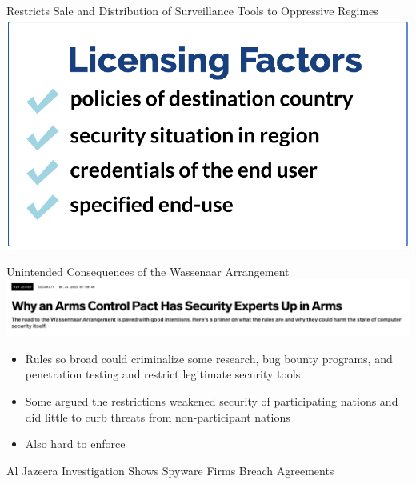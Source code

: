 \documentclass[nobackground,dvipsnames,table,aspectratio=169]{beamer}
\begin{document}
\begin{frame}{Restricts Sale and Distribution of Surveillance Tools to Oppressive Regimes}
    \centering
    \includegraphics[height=0.8\textheight]{wassenaar-licensing-factors}
\end{frame}

\begin{frame}{Unintended Consequences of the Wassenaar Arrangement}
    \includegraphics[width=\textwidth]{wired-arms-control}
    \begin{itemize}
        \item Rules so broad could criminalize some research, bug bounty programs, and penetration testing and restrict legitimate security tools 
        \item Some argued the restrictions weakened security of participating nations and did little to curb threats from non-participant nations
        \item Also hard to enforce 
    \end{itemize}
\end{frame}

\begin{frame}{Al Jazeera Investigation Shows Spyware Firms Breach Agreements}
\end{frame}
\end{document}
